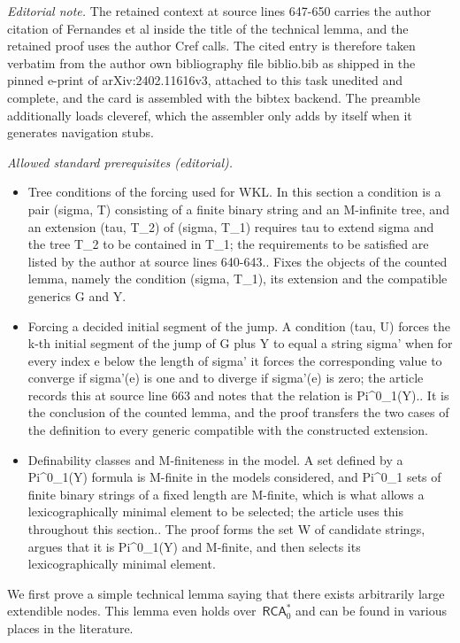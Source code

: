 \documentclass{article}
\numberwithin{theorem}{section}
\newcommand{\RCA}{\mathsf{RCA}}
\begin{document}
\noindent\textit{Editorial note.} The retained context at source lines 647-650 carries the author citation of Fernandes et al inside the title of the technical lemma, and the retained proof uses the author Cref calls. The cited entry is therefore taken verbatim from the author own bibliography file biblio.bib as shipped in the pinned e-print of arXiv:2402.11616v3, attached to this task unedited and complete, and the card is assembled with the bibtex backend. The preamble additionally loads cleveref, which the assembler only adds by itself when it generates navigation stubs.\par\medskip
\noindent\textit{Allowed standard prerequisites (editorial).}\begin{itemize}
\item Tree conditions of the forcing used for WKL. In this section a condition is a pair (sigma, T) consisting of a finite binary string and an M-infinite tree, and an extension (tau, T\_2) of (sigma, T\_1) requires tau to extend sigma and the tree T\_2 to be contained in T\_1; the requirements to be satisfied are listed by the author at source lines 640-643.. Fixes the objects of the counted lemma, namely the condition (sigma, T\_1), its extension and the compatible generics G and Y.
\item Forcing a decided initial segment of the jump. A condition (tau, U) forces the k-th initial segment of the jump of G plus Y to equal a string sigma' when for every index e below the length of sigma' it forces the corresponding value to converge if sigma'(e) is one and to diverge if sigma'(e) is zero; the article records this at source line 663 and notes that the relation is Pi\textasciicircum{}0\_1(Y).. It is the conclusion of the counted lemma, and the proof transfers the two cases of the definition to every generic compatible with the constructed extension.
\item Definability classes and M-finiteness in the model. A set defined by a Pi\textasciicircum{}0\_1(Y) formula is M-finite in the models considered, and Pi\textasciicircum{}0\_1 sets of finite binary strings of a fixed length are M-finite, which is what allows a lexicographically minimal element to be selected; the article uses this throughout this section.. The proof forms the set W of candidate strings, argues that it is Pi\textasciicircum{}0\_1(Y) and M-finite, and then selects its lexicographically minimal element.
\end{itemize}\medskip
We first prove a simple technical lemma saying that there exists arbitrarily large extendible nodes. This lemma even holds over~$\RCA_0^*$ and can be found in various places in the literature.
\end{document}
